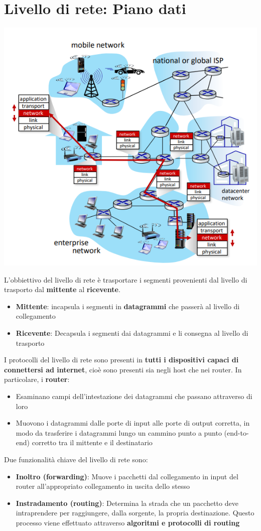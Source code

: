 \documentclass[12pt]{article}
\begin{document}
\section{Livello di rete: Piano dati}
\begin{center}
    \includegraphics[width = 0.75\linewidth]{Images/73.png}
\end{center}
L'obbiettivo del livello di rete è trasportare i segmenti provenienti dal livello di trasporto dal \textbf{mittente} al \textbf{ricevente}.
\begin{itemize}
    \item \textbf{Mittente}: incapsula i segmenti in \textbf{datagrammi} che passerà al livello di collegamento
    \item \textbf{Ricevente}: Decapsula i segmenti dai datagrammi e li consegna al livello di trasporto
\end{itemize}
I protocolli del livello di rete sono presenti in \textbf{tutti i dispositivi capaci di connettersi ad internet}, cioè sono presenti sia negli host che nei router.
In particolare, i \textbf{router}:
\begin{itemize}
    \item Esaminano campi dell'intestazione dei datagrammi che passano attraverso di loro
    \item Muovono i datagrammi dalle porte di input alle porte di output corretta, in modo da trasferire i datagrammi lungo un cammino punto a punto (end-to-end) corretto tra il mittente e il destinatario
\end{itemize}
Due funzionalità chiave del livello di rete sono:
\begin{itemize}
    \item \textbf{Inoltro (forwarding)}: Muove i pacchetti dal collegamento in input del router all'appropriato collegamento in uscita dello stesso
    \item \textbf{Instradamento (routing)}: Determina la strada che un pacchetto deve intraprendere per raggiungere, dalla sorgente, la propria destinazione. Questo processo viene effettuato attraverso \textbf{algoritmi e protocolli di routing}
\end{itemize}
\end{document}
